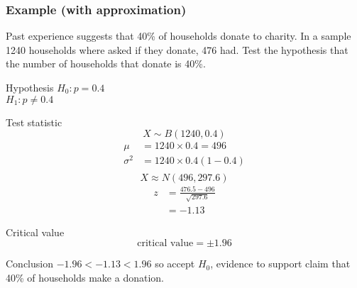         \subsubsection{Example (with approximation)}
        \begin{example}
        {
            Past experience suggests that 40\% of households donate to charity. In a sample 1240 households where asked if they donate, 476 had. Test the hypothesis that the number of households that donate is 40\%.
        }

        \begin{step}{Hypothesis}
        $H_0: p = 0.4$\\ 
        $H_1: p \ne 0.4$
        \end{step}

        \begin{step}{Test statistic}
        $$X \sim B(1240, 0.4)$$ 
        \begin{align*}
        \mu &= 1240 \times 0.4 = 496\\
        \sigma^2 &= 1240 \times 0.4(1 - 0.4)\\
        \end{align*}
        $$X \approx N(496, 297.6)$$
        \begin{align*}
        z &= \frac{476.5 - 496}{\sqrt{297.6}} \\
          &= -1.13
        \end{align*}
        \end{step}

        \begin{step}{Critical value}
        $$ \text{critical value} = \pm 1.96 $$
        \end{step}

        \begin{step}{Conclusion}
        $-1.96 < -1.13 < 1.96$ so accept $H_0$, evidence to support claim that 40\% of households make a donation.
        \end{step}

        \end{example}